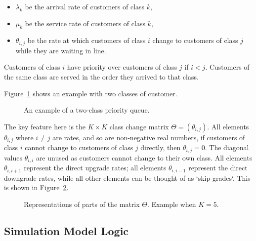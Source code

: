 \documentclass{article}
\begin{document}
\begin{itemize}
  \item $\lambda_k$ be the arrival rate of customers of class $k$,
  \item $\mu_k$ be the service rate of customers of class $k$,
  \item $\theta_{i,j}$ be the rate at which customers of class $i$ change
  to customers of class $j$ while they are waiting in line.
\end{itemize}

Customers of class $i$ have priority over customers of class $j$ if $i < j$.
Customers of the same class are served in the order they arrived to that class.

Figure~\ref{fig:twoclass_example} shows an example with two classes of customer.

\begin{figure}
\begin{center}

\end{center}
\caption{An example of a two-class priority queue.}
\label{fig:twoclass_example}
\end{figure}

The key feature here is the $K \times K$ class change matrix
$\Theta = (\theta_{i,j})$. All elements $\theta_{i,j}$ where $i \neq j$ are
rates, and so are non-negative real numbers, if customers of class $i$ cannot
change to customers of class $j$ directly, then $\theta_{i,j} = 0$. The diagonal
values $\theta_{i,i}$ are unused as customers cannot change to their own class.
All elements $\theta_{i,i+1}$ represent the direct upgrade rates; all elements
$\theta_{i,i-1}$ represent the direct downgrade rates, while all other elements
can be thought of as `skip-grades`.
This is shown in Figure~\ref{fig:skipgrades}.

\begin{figure}
\begin{center}

\end{center}
\caption{Representations of parts of the matrix $\Theta$. Example when $K=5$.}
\label{fig:skipgrades}
\end{figure}


\subsection{Simulation Model Logic}
\end{document}
